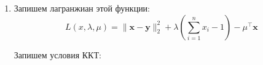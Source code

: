 \documentclass{article}
\begin{document}
\begin{enumerate}
	      Запишем лагранжиан:
	      \[
		      L(\mathbf{X}, \lambda) =
		      \mathrm{trace}(\mathbf{X}) -
		      \log \det(\mathbf{X}) +
		      \lambda^\top (\mathbf{Xz} - \mathbf{y})
	      \]

	      Запишем градиент по $\mathbf{X}$:

	      \begin{align*}
		      \frac{\partial L}{\partial \mathbf{X}_{ij}} & = \mathbf{I}_{ij} - \frac{1}{\det(\mathbf{X})}
		      \mathrm{adj}(\mathbf{X}_{ij}) - \lambda_i \mathbf{z}_j                                       \\  & = \mathbf{I}_{ij} -
		      \mathbf{X}^{-1}_{ij} - \lambda_i \mathbf{z}_j
	      \end{align*}

	      Откуда имеем:

	      \[
		      \frac{\partial L}{\partial \mathbf{X}} = \mathbf{I} - \mathbf{X}^{-1} - \lambda \mathbf{z}^\top
	      \]

	      Решение $\frac{\partial L}{\partial \mathbf{X}} = 0$ даёт:

	      \[
		      \mathbf{X} = {(\mathbf{I} + \lambda \mathbf{z}^\top)}^{-1}
	      \]

	      Мы знаем, что $\mathbf{Xz} =
		      \mathbf{y} \iff \mathbf{z} =
		      \mathbf{X}^{-1}\mathbf{y}$,
	      а также $\mathbf{X}^{-1} = \mathbf{I} +
		      \lambda \mathbf{z}^\top$.
	      Отсюда получаем:
	      \begin{align*}
		       & (\mathbf{I} + \lambda \mathbf{z}^\top) \mathbf{y} = \mathbf{z} \iff  \\
		       & \mathbf{y} + \lambda \mathbf{z}^\top \mathbf{y} = \mathbf{z} \iff    \\
		       & \lambda = \frac{\mathbf{z} - \mathbf{y}}{\mathbf{z}^\top \mathbf{y}}
	      \end{align*}

	      Таким образом, решение задачи имеет вид:

	      \[
		      \mathbf{X} = {\left( \mathbf{I} + \frac{\mathbf{z} - \mathbf{y}}{\mathbf{z}^\top \mathbf{y}} \mathbf{z}^\top \right) }^{-1}
	      \]

	\item Запишем лагранжиан этой функции:
	      \[
		      L(x, \lambda, \mu) =
		      \|\mathbf{x} - \mathbf{y}\|_2^2 +
		      \lambda \left( \sum_{i=1}^n x_i - 1 \right) -
		      \mu^\top \mathbf{x}
	      \]

	      Запишем условия ККТ:


\end{enumerate}
\end{document}
